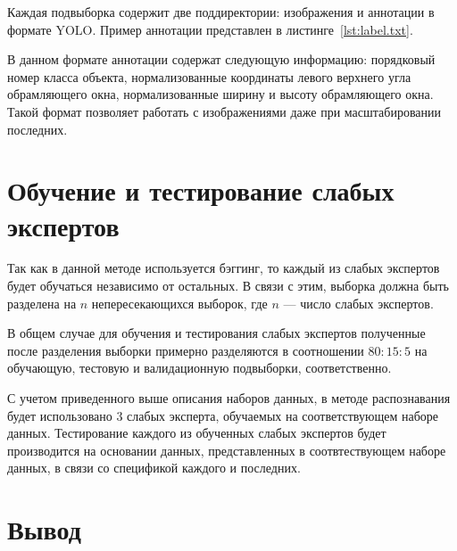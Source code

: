 Каждая подвыборка содержит две поддиректории: изображения и аннотации в формате YOLO. Пример аннотации представлен в листинге~\ref{lst:label.txt}.


В данном формате аннотации содержат следующую информацию: порядковый номер класса объекта, нормализованные координаты левого верхнего угла обрамляющего окна, нормализованные ширину и высоту обрамляющего окна. Такой формат позволяет работать с изображениями даже при масштабировании последних.

\section{Обучение и тестирование слабых экспертов}

Так как в данной методе используется бэггинг, то каждый из слабых экспертов будет обучаться независимо от остальных. В связи с этим, выборка должна быть разделена на $n$ непересекающихся выборок, где $n$ --- число слабых экспертов.

В общем случае для обучения и тестирования слабых экспертов полученные после разделения выборки примерно разделяются в соотношении $80:15:5$ на обучающую, тестовую и валидационную подвыборки, соответственно.

С учетом приведенного выше описания наборов данных, в методе распознавания будет использовано 3 слабых эксперта, обучаемых на соответствующем наборе данных. Тестирование каждого из обученных слабых экспертов будет производится на основании данных, представленных в соотвтествующем наборе данных, в связи со спецификой каждого и последних.

\section{Вывод}
